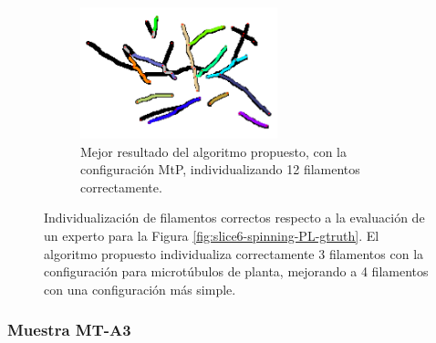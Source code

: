 \begin{figure}[h!]
\begin{subfigure}[t]{0.48\textwidth}
    \end{subfigure}
    \hspace{0.2cm}
    \begin{subfigure}[t]{0.48\textwidth}
        \centering
        \includegraphics[height=1.5in]{resultImages/Slice6-Spinning-PL-gtruth-preSkel-BW-littleClean-phil-s8192-v05-exactMatch-no-label-ants.png}
        \caption{Mejor resultado del algoritmo propuesto, con la configuraci\'on MtP, individualizando 12 filamentos correctamente.}
        \label{fig:MTA2-best-phil}
    \end{subfigure}
        
    \caption[Individualizaci\'on de filamentos correctos respecto a la evaluaci\'on de un experto para la Figura \ref{fig:slice6-spinning-PL-gtruth}.]{Individualizaci\'on de filamentos correctos respecto a la evaluaci\'on de un experto para la Figura \ref{fig:slice6-spinning-PL-gtruth}. El algoritmo propuesto individualiza correctamente 3 filamentos con la configuraci\'on para microt\'ubulos de planta, mejorando a 4 filamentos con una configuraci\'on m\'as simple.}
    \label{fig:slice6-spinning-PL-gtruth-MTA2-results}
\end{figure}

\subsubsection{Muestra MT-A3}

